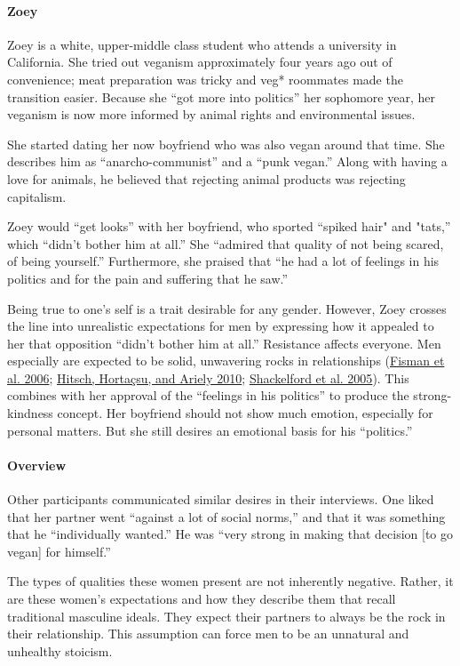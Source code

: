 \documentclass[twoside]{report}
\begin{document}
\paragraph{Zoey}

Zoey is a white, upper-middle class student who attends a university in
California. She tried out veganism approximately four years ago out of
convenience; meat preparation was tricky and veg* roommates made the transition easier. Because she ``got more into politics'' her sophomore year, her veganism is now more informed by animal rights and environmental issues.

She started dating her now boyfriend who was also vegan around that time. She describes him as ``anarcho-communist'' and a ``punk vegan.'' Along with having a love for animals, he believed that rejecting animal products was rejecting capitalism.

Zoey would ``get looks'' with her boyfriend, who sported ``spiked hair" and
"tats,'' which ``didn't bother him at all.'' She ``admired that quality
of not being scared, of being yourself.'' Furthermore, she praised that
``he had a lot of feelings in his politics and for the pain and
suffering that he saw.''

Being true to one's self is a trait desirable for any gender. However,
Zoey crosses the line into unrealistic expectations for men by
expressing how it appealed to her that opposition ``didn't bother him at
all.'' Resistance affects everyone. Men especially are expected to be
solid, unwavering rocks in relationships (\hyperlink{fisman}{Fisman et al. 2006}; \hyperlink{hitsch2}{Hitsch, Hortaçsu, and Ariely 2010}; \hyperlink{shackelford}{Shackelford et al. 2005}). This combines
with her approval of the ``feelings in his politics'' to produce the
strong-kindness concept. Her boyfriend should not show much emotion,
especially for personal matters. But she still desires an emotional
basis for his ``politics.''
%
\paragraph{Overview}

Other participants communicated similar desires in their interviews. One
liked that her partner went ``against a lot of social norms,'' and that
it was something that he ``individually wanted.'' He was ``very strong
in making that decision {[}to go vegan{]} for himself.''

The types of qualities these women present are not inherently negative.
Rather, it are these women's expectations and how they describe them
that recall traditional masculine ideals. They expect their partners to
always be the rock in their relationship. This assumption can force men
to be an unnatural and unhealthy stoicism. 
\end{document}
